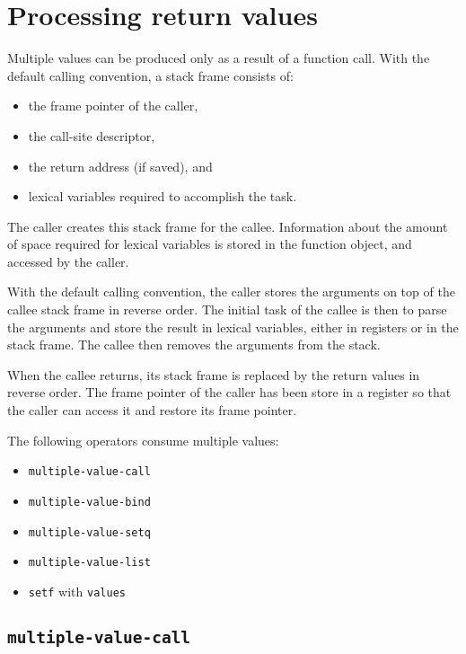 \chapter{Processing return values}

Multiple values can be produced only as a result of a function call.
With the default calling convention, a stack frame consists of:

\begin{itemize}
\item the frame pointer of the caller,
\item the call-site descriptor,
\item the return address (if saved), and
\item lexical variables required to accomplish the task.
\end{itemize}

The caller creates this stack frame for the callee.  Information about
the amount of space required for lexical variables is stored in the
function object, and accessed by the caller.

With the default calling convention, the caller stores the arguments
on top of the callee stack frame in reverse order.  The initial task
of the callee is then to parse the arguments and store the result in
lexical variables, either in registers or in the stack frame.  The
callee then removes the arguments from the stack.

When the callee returns, its stack frame is replaced by the return
values in reverse order.  The frame pointer of the caller has been
store in a register so that the caller can access it and restore its
frame pointer.

The following operators consume multiple values:

\begin{itemize}
\item \texttt{multiple-value-call}
\item \texttt{multiple-value-bind}
\item \texttt{multiple-value-setq}
\item \texttt{multiple-value-list}
\item \texttt{setf} with \texttt{values}
\end{itemize}

\section{\texttt{multiple-value-call}}

